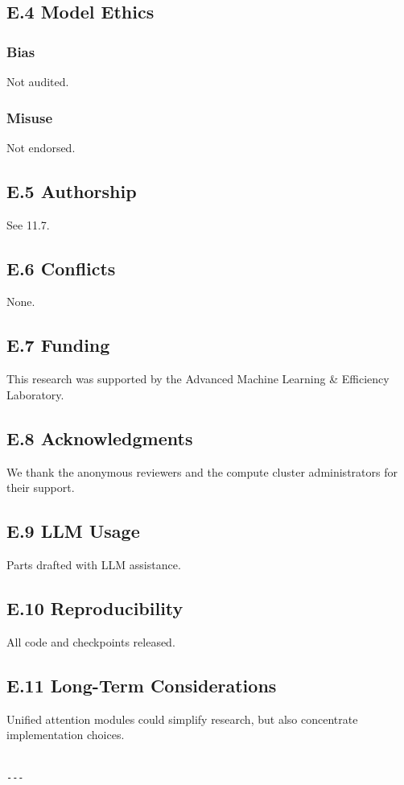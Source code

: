 \subsection{E.4 Model Ethics}

\subsubsection{Bias}
Not audited.

\subsubsection{Misuse}
Not endorsed.

\subsection{E.5 Authorship}
See  11.7.

\subsection{E.6 Conflicts}
None.

\subsection{E.7 Funding}
This research was supported by the Advanced Machine Learning \& Efficiency Laboratory.

\subsection{E.8 Acknowledgments}
We thank the anonymous reviewers and the compute cluster administrators for their support.

\subsection{E.9 LLM Usage}
Parts drafted with LLM assistance.

\subsection{E.10 Reproducibility}
All code and checkpoints released.

\subsection{E.11 Long-Term Considerations}
Unified attention modules could simplify research, but also concentrate 
implementation choices.
\begin{lstlisting}

---
\end{lstlisting}

